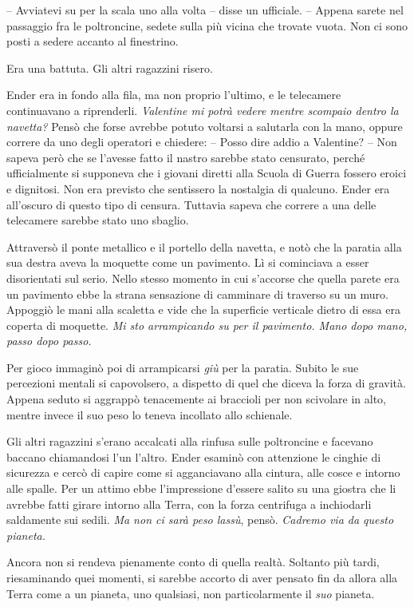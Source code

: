 {-- Avviatevi su per la scala uno alla volta -- disse un ufficiale. --
	Appena sarete nel passaggio fra le poltroncine, sedete sulla più vicina
	che trovate vuota. Non ci sono posti a sedere accanto al finestrino.}

{Era una battuta. Gli altri ragazzini risero.}

{Ender era in fondo alla fila, ma non proprio l'ultimo, e le telecamere
	continuavano a riprenderli. \emph{Valentine mi potrà vedere mentre
		scompaio dentro la navetta?} Pensò che forse avrebbe potuto voltarsi a
	salutarla con la mano, oppure correre da uno degli operatori e chiedere:
	-- Posso dire addio a Valentine? -- Non sapeva però che se l'avesse
	fatto il nastro sarebbe stato censurato, perché ufficialmente si
	supponeva che i giovani diretti alla Scuola di Guerra fossero eroici e
	dignitosi. Non era previsto che sentissero la nostalgia di qualcuno.
	Ender era all'oscuro di questo tipo di censura. Tuttavia sapeva che
	correre a una delle telecamere sarebbe stato uno sbaglio.}

{Attraversò il ponte metallico e il portello della navetta, e notò che
	la paratia alla sua destra aveva la moquette come un pavimento. Lì si
	cominciava a esser disorientati sul serio. Nello stesso momento in cui
	s'accorse che quella parete era un pavimento ebbe la strana sensazione
	di camminare di traverso su un muro. Appoggiò le mani alla scaletta e
	vide che la superficie verticale dietro di essa era coperta di moquette.
	\emph{Mi sto arrampicando su per il pavimento. Mano dopo mano, passo
		dopo passo.}}

{Per gioco immaginò poi di arrampicarsi \emph{giù} per la paratia.
	Subito le sue percezioni mentali si capovolsero, a dispetto di quel che
	diceva la forza di gravità. Appena seduto si aggrappò tenacemente ai
	braccioli per non scivolare in alto, mentre invece il suo peso lo teneva
	incollato allo schienale.}

{Gli altri ragazzini s'erano accalcati alla rinfusa sulle poltroncine e
	facevano baccano chiamandosi l'un l'altro. Ender esaminò con attenzione
	le cinghie di sicurezza e cercò di capire come si agganciavano alla
	cintura, alle cosce e intorno alle spalle. Per un attimo ebbe
	l'impressione d'essere salito su una giostra che li avrebbe fatti girare
	intorno alla Terra, con la forza centrifuga a inchiodarli saldamente sui
	sedili. \emph{Ma non ci sarà peso lassù}, \emph{} pensò. \emph{Cadremo
		via da questo pianeta.}}

{Ancora non si rendeva pienamente conto di quella realtà. Soltanto più
	tardi, riesaminando quei momenti, si sarebbe accorto di aver pensato fin
	da allora alla Terra come a un pianeta, uno qualsiasi, non
	particolarmente il \emph{suo} pianeta.}

